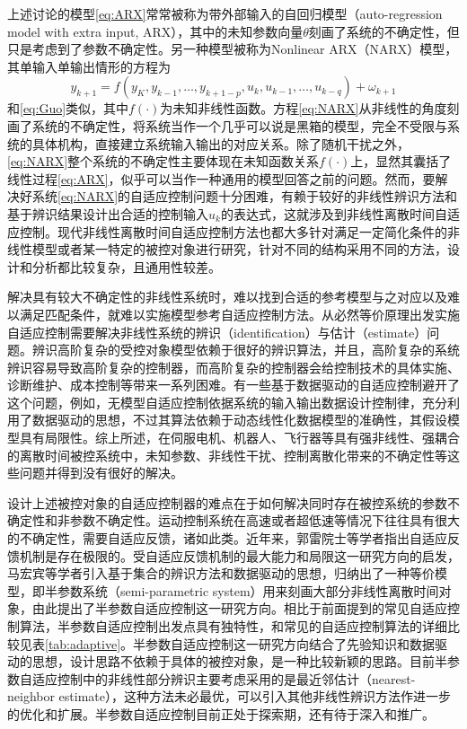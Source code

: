 上述讨论的模型\eqref{eq:ARX}常常被称为带外部输入的自回归模型（auto-regression model with extra input, ARX），其中的未知参数向量$\theta$刻画了系统的不确定性，但只是考虑到了参数不确定性。另一种模型被称为Nonlinear ARX（NARX）模型，其单输入单输出情形的方程为
\begin{equation}%
\label{eq:NARX}
y_{k+1} = f(y_{K},y_{k-1},\ldots,y_{k+1-p},u_{k},u_{k-1},\ldots,u_{k-q})+\omega_{k+1}
\end{equation}
和\eqref{eq:Guo}类似，其中$f(\cdot)$为未知非线性函数。方程\eqref{eq:NARX}从非线性的角度刻画了系统的不确定性，将系统当作一个几乎可以说是黑箱的模型，完全不受限与系统的具体机构，直接建立系统输入输出的对应关系。除了随机干扰之外，\eqref{eq:NARX}整个系统的不确定性主要体现在未知函数关系$f(\cdot)$上，显然其囊括了线性过程\eqref{eq:ARX}，似乎可以当作一种通用的模型回答之前的问题。然而，要解决好系统\eqref{eq:NARX}的自适应控制问题十分困难，有赖于较好的非线性辨识方法和基于辨识结果设计出合适的控制输入$u_{k}$的表达式，这就涉及到非线性离散时间自适应控制。现代非线性离散时间自适应控制方法也都大多针对满足一定简化条件的非线性模型或者某一特定的被控对象进行研究，针对不同的结构采用不同的方法，设计和分析都比较复杂，且通用性较差。

解决具有较大不确定性的非线性系统时，难以找到合适的参考模型与之对应以及难以满足匹配条件，就难以实施模型参考自适应控制方法。从必然等价原理出发实施自适应控制需要解决非线性系统的辨识（identification）与估计（estimate）问题。辨识高阶复杂的受控对象模型依赖于很好的辨识算法，并且，高阶复杂的系统辨识容易导致高阶复杂的控制器，而高阶复杂的控制器会给控制技术的具体实施、诊断维护、成本控制等带来一系列困难。有一些基于数据驱动的自适应控制避开了这个问题，例如，无模型自适应控制依据系统的输入输出数据设计控制律，充分利用了数据驱动的思想，不过其算法依赖于动态线性化数据模型的准确性，其假设模型具有局限性。综上所述，在伺服电机、机器人、飞行器等具有强非线性、强耦合的离散时间被控系统中，未知参数、非线性干扰、控制离散化带来的不确定性等这些问题并得到没有很好的解决。

设计上述被控对象的自适应控制器的难点在于如何解决同时存在被控系统的参数不确定性和非参数不确定性。运动控制系统在高速或者超低速等情况下往往具有很大的不确定性，需要自适应反馈，诸如此类。近年来，郭雷院士等学者指出自适应反馈机制是存在极限的。受自适应反馈机制的最大能力和局限这一研究方向的启发，马宏宾等学者引入基于集合的辨识方法和数据驱动的思想，归纳出了一种等价模型，即半参数系统（semi-parametric system）用来刻画大部分非线性离散时间对象，由此提出了半参数自适应控制这一研究方向。相比于前面提到的常见自适应控制算法，半参数自适应控制出发点具有独特性，和常见的自适应控制算法的详细比较见表\eqref{tab:adaptive}。半参数自适应控制这一研究方向结合了先验知识和数据驱动的思想，设计思路不依赖于具体的被控对象，是一种比较新颖的思路。目前半参数自适应控制中的非线性部分辨识主要考虑采用的是最近邻估计（nearest-neighbor estimate），这种方法未必最优，可以引入其他非线性辨识方法作进一步的优化和扩展。半参数自适应控制目前正处于探索期，还有待于深入和推广。

